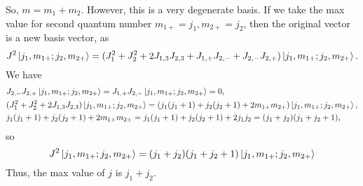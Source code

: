 So, $m = m_1 + m_2$. However, this is a very degenerate basis. If we take the max value for second quantum number $m_{1+}=j_1, m_{2+}=j_2$, then the original vector is a new basis vector, as
\begin{equation*}
    J^2 \ket{j_1, m_{1+}; j_2, m_{2+}} = (J_1^2 + J_2^2 + 2J_{1, 3}J_{2, 3} + J_{1, +}J_{2, -} + J_{2, -}J_{2, +})\ket{j_1, m_{1+}; j_2, m_{2+}}.
\end{equation*}
We have 
\begin{align*}
    &J_{2, -}J_{2, +}\ket{j_1, m_{1+}; j_2, m_{2+}} = J_{1, +}J_{2, -}\ket{j_1, m_{1+}; j_2, m_{2+}} = 0, \\
    & (J_1^2 + J_2^2 + 2J_{1, 3}J_{2, 3})\ket{j_1, m_{1+}; j_2, m_{2+}}  = (j_1(j_1+1) + j_2(j_2+1) + 2m_{1+}m_{2+})\ket{j_1, m_{1+}; j_2, m_{2+}}, \\
    & j_1(j_1+1) + j_2(j_2+1) + 2m_{1+}m_{2+} = j_1(j_1+1) + j_2(j_2+1) + 2j_1j_2 = (j_1 + j_2)(j_1 + j_2 + 1),                              
\end{align*}
so
\begin{equation*}
    J^2 \ket{j_1, m_{1+}; j_2, m_{2+}} = (j_1 + j_2)(j_1 + j_2 + 1) \ket{j_1, m_{1+}; j_2, m_{2+}}
\end{equation*}
Thus, the max value of $j$ is $j_1 + j_2$.